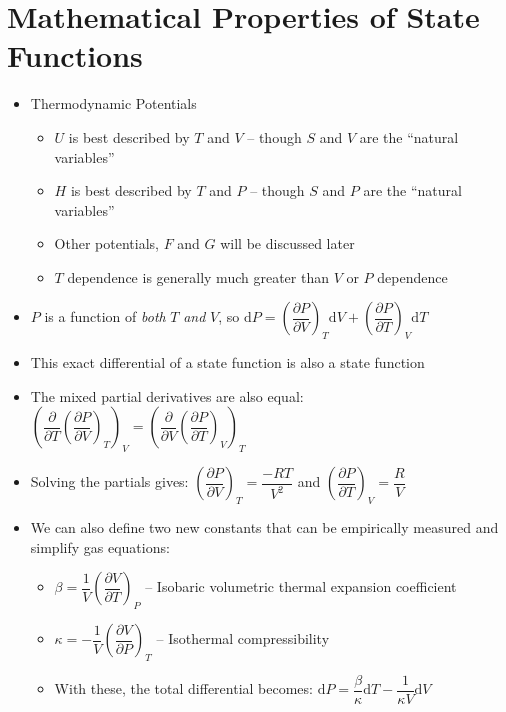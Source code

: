 \documentclass[12pt, openany, letterpaper]{memoir}
\begin{document}
\section*{Mathematical Properties of State Functions}
\begin{itemize}
	\item Thermodynamic Potentials
	\begin{itemize}
		\item $U$ is best described by $T$ and $V$ -- though $S$ and $V$ are the ``natural variables''
		\item $H$ is best described by $T$ and $P$ -- though $S$ and $P$ are the ``natural variables''
		\item Other potentials, $F$ and $G$ will be discussed later
		\item $T$ dependence is generally much greater than $V$ or $P$ dependence
	\end{itemize}
	\item $P$ is a function of \emph{both} $T$ \emph{and} $V$, so $\mathrm{d}P=\left(\dfrac{\partial P}{\partial V}\right)_T \mathrm{d}V + \left(\dfrac{\partial P}{\partial T}\right)_V \mathrm{d} T$
	\item This exact differential of a state function is also a state function
	\item The mixed partial derivatives are also equal: $\left(\dfrac{\partial}{\partial T}\left(\dfrac{\partial P}{\partial V}\right)_T\right)_V = \left(\dfrac{\partial}{\partial V}\left(\dfrac{\partial P}{\partial T}\right)_V\right)_T$
	\item Solving the partials gives: $\left(\dfrac{\partial P}{\partial V}\right)_T=\dfrac{-RT}{V^2}$ \hspace{1em} and \hspace{1em} $\left(\dfrac{\partial P}{\partial T}\right)_V=\dfrac{R}{V}$
	\item We can also define two new constants that can be empirically measured and simplify gas equations:
	\begin{itemize}
		\item $\beta = \dfrac{1}{V}\left(\dfrac{\partial V}{\partial T}\right)_P$ -- Isobaric volumetric thermal expansion coefficient
		\item $\kappa = -\dfrac{1}{V}\left(\dfrac{\partial V}{\partial P}\right)_T$ -- Isothermal compressibility
		\item With these, the total differential becomes: $\mathrm{d}P = \dfrac{\beta}{\kappa}\mathrm{d} T - \dfrac{1}{\kappa V}\mathrm{d} V$
	\end{itemize}	
\end{itemize}
\end{document}
